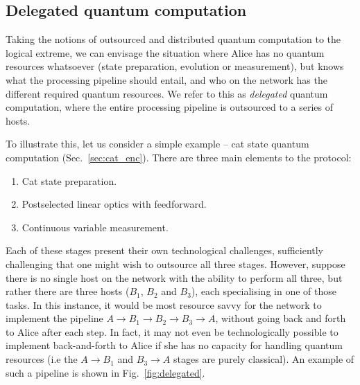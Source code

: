 \documentclass[aps,rmp,twocolumn,amsmath,amssymb,nofootinbib,superscriptaddress]{revtex4}
\begin{document}
%
%

\subsection{Delegated quantum computation}

Taking the notions of outsourced and distributed quantum computation to the logical extreme, we can envisage the situation where Alice has no quantum resources whatsoever (state preparation, evolution or measurement), but knows what the processing pipeline should entail, and who on the network has the different required quantum resources. We refer to this as \emph{delegated} quantum computation, where the entire processing pipeline is outsourced to a series of hosts.

To illustrate this, let us consider a simple example -- cat state quantum computation (Sec.~\ref{sec:cat_enc}). There are three main elements to the protocol:
\begin{enumerate}
\item Cat state preparation.
\item Postselected linear optics with feedforward.
\item Continuous variable measurement.
\end{enumerate}

Each of these stages present their own technological challenges, sufficiently challenging that one might wish to outsource all three stages. However, suppose there is no single host on the network with the ability to perform all three, but rather there are three hosts ($B_1$, $B_2$ and $B_3$), each specialising in one of those tasks. In this instance, it would be most resource savvy for the network to implement the pipeline \mbox{$A\to B_1\to B_2\to B_3\to A$}, without going back and forth to Alice after each step. In fact, it may not even be technologically possible to implement back-and-forth to Alice if she has no capacity for handling quantum resources (i.e the \mbox{$A\to B_1$} and \mbox{$B_3\to A$} stages are purely classical). An example of such a pipeline is shown in Fig.~\ref{fig:delegated}.
\end{document}
